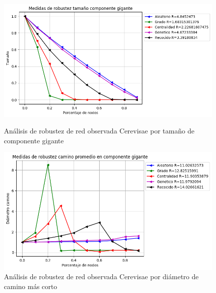 \begin{figure}[!htb]
    \begin{minipage}{0.48\textwidth}
        \centering
        \includegraphics[scale=0.4]{CapituloAAnexos/imagenesAnexoC/Robustez/grafica_GC20180510_203826cerevisiae}
        \caption{Análisis de robustez de red observada Cerevisae por tamaño de componente gigante}
    \end{minipage}\hfill
   \begin{minipage}{0.48\textwidth}
         \centering
       \includegraphics[scale=0.4]{CapituloAAnexos/imagenesAnexoC/Robustez/grafica_APL20180510_203826cerevisiae}
        \caption{Análisis de robustez de red observada Cerevisae por diámetro de camino más corto}
    \end{minipage}
\end{figure}


